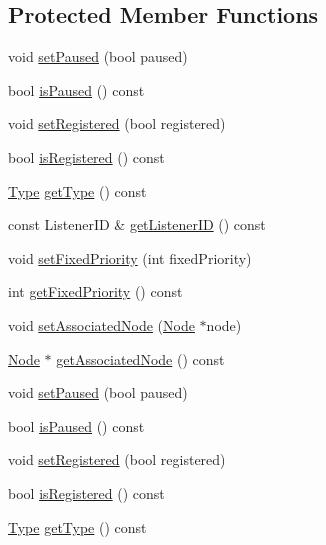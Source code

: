 \subsection*{Protected Member Functions}
\begin{DoxyCompactItemize}
\item 
void \hyperlink{classEventListener_a1897f06fa8bb777f636d3c7396d20a40}{set\+Paused} (bool paused)
\item 
bool \hyperlink{classEventListener_a4ea8de9a3aec84b0239fe7f4b104f53c}{is\+Paused} () const
\item 
void \hyperlink{classEventListener_afd6557f250049331bf58d5f291634b82}{set\+Registered} (bool registered)
\item 
bool \hyperlink{classEventListener_a01d25b75d01ebd4abbb6e5083a087df5}{is\+Registered} () const
\item 
\hyperlink{classEventListener_ab78e6acdfa2343490eda9e92d1555ee4}{Type} \hyperlink{classEventListener_ab04aa6c4e270b35ecd801c276d98f3b4}{get\+Type} () const
\item 
const Listener\+ID \& \hyperlink{classEventListener_ad6a1e5ec2ed320b48801228317d56624}{get\+Listener\+ID} () const
\item 
void \hyperlink{classEventListener_a01a0f3888940db868f7428094e19fe4a}{set\+Fixed\+Priority} (int fixed\+Priority)
\item 
int \hyperlink{classEventListener_ab19a7deec6bb7d936573ec33eff96891}{get\+Fixed\+Priority} () const
\item 
void \hyperlink{classEventListener_a6d1e92c8e26170ac8ec877446f619120}{set\+Associated\+Node} (\hyperlink{classNode}{Node} $\ast$node)
\item 
\hyperlink{classNode}{Node} $\ast$ \hyperlink{classEventListener_a932ac8413ce8bec211320f36d8c30717}{get\+Associated\+Node} () const
\item 
void \hyperlink{classEventListener_a1897f06fa8bb777f636d3c7396d20a40}{set\+Paused} (bool paused)
\item 
bool \hyperlink{classEventListener_a4ea8de9a3aec84b0239fe7f4b104f53c}{is\+Paused} () const
\item 
void \hyperlink{classEventListener_afd6557f250049331bf58d5f291634b82}{set\+Registered} (bool registered)
\item 
bool \hyperlink{classEventListener_a01d25b75d01ebd4abbb6e5083a087df5}{is\+Registered} () const
\item 
\hyperlink{classEventListener_ab78e6acdfa2343490eda9e92d1555ee4}{Type} \hyperlink{classEventListener_ab04aa6c4e270b35ecd801c276d98f3b4}{get\+Type} () const

\end{DoxyCompactItemize}
